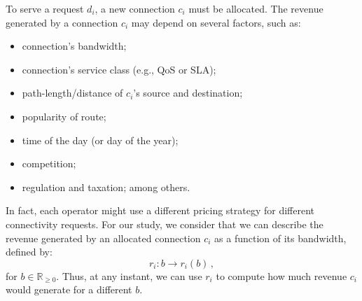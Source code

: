 \documentclass[journal]{IEEEtran}
\begin{document}
To serve a request $d_i$, a new connection $c_i$ must be allocated.
The revenue generated by a connection $c_i$ may depend on several factors, such as:
\begin{itemize}
\item connection's bandwidth;
\item connection's service class (e.g., QoS or SLA); 
\item path-length/distance of $c_i$'s source and destination; 
\item popularity of route; 
\item time of the day (or day of the year); 
\item competition; 
\item regulation and taxation; among others.
\end{itemize}

In fact, each operator might use a different pricing strategy for different connectivity requests. For our study, we consider that we can describe the revenue generated by an allocated connection $c_i$ as a function of its bandwidth, defined by:
$$r_i:b \rightarrow r_i(b) \,,$$
for $b \in \mathbb{R}_{\geq 0}$. Thus, at any instant, we can use $r_i$ to compute how much revenue $c_i$ would generate for a different $b$.
\end{document}
